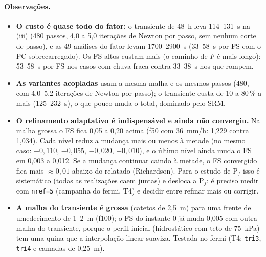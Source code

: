 \paragraph{Observações.}
\begin{itemize}
  \item \textbf{O custo é quase todo do fator:} o transiente de 48~h leva 114--131~s na (iii) (480 passos, 4,0 a 5,0
    iterações de Newton por passo, sem nenhum corte de passo), e as 49 análises do fator levam 1700--2900~s (33--58~s por FS com
    o PC sobrecarregado). Os FS altos custam mais (o caminho de $F$ é mais longo): 53--58~s por FS nos casos com chuva
    fraca contra 33--38~s nos que rompem.
  \item \textbf{As variantes acopladas} usam a mesma malha e os mesmos passos (480, com 4,0--5,2 iterações de Newton
    por passo); o transiente custa de 10 a 80\,\% a mais (125--232~s), o que pouco muda o total, dominado pelo SRM.
  \item \textbf{O refinamento adaptativo é indispensável e ainda não convergiu.} Na malha grossa o FS fica 0,05 a 0,20
    acima (f50 com 36~mm/h: 1,229 contra 1,034). Cada nível reduz a mudança mais ou menos à metade (no mesmo caso:
    $-0{,}110$, $-0{,}055$, $-0{,}020$, $-0{,}010$), e o último nível ainda muda o FS em 0,003 a 0,012. Se a mudança
    continuar caindo à metade, o FS convergido fica mais $\approx 0{,}01$ abaixo do relatado (Richardson). Para o
    estudo de P$_f$ isso é sistemático (todas as realizações caem juntas) e desloca a P$_f$: é preciso medir com
    \texttt{nref=5} (campanha do fermi, T4) e decidir entre refinar mais ou corrigir.
  \item \textbf{A malha do transiente é grossa} (catetos de 2,5~m) para uma frente de umedecimento de 1--2~m (f100);
    o FS do instante 0 já muda 0,005 com outra malha do transiente, porque o perfil inicial (hidrostático com teto de
    75~kPa) tem uma quina que a interpolação linear suaviza. Testada no fermi (T4: \texttt{tri3}, \texttt{tri4} e
    camadas de 0,25~m).
\end{itemize}
